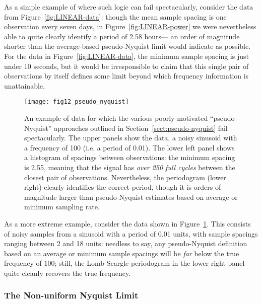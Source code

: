 \documentclass[preprint]{aastex}
\newcommand{\fig}[1]{Figure~\ref{fig:#1}}
\newcommand{\figlabel}[1]{\label{fig:#1}}
\newcommand{\Sect}[1]{Section~\ref{sect:#1}}
\newcommand{\sect}[1]{\Sect{#1}}
\newcommand{\sectlabel}[1]{\label{sect:#1}}
\begin{document}
As a simple example of where such logic can fail spectacularly,
consider the data from \fig{LINEAR-data}: though the mean sample
spacing is one observation every seven days, in \fig{LINEAR-power}
we were nevertheless able to quite clearly identify a period of 2.58 hours---
an order of magnitude shorter than the average-based pseudo-Nyquist limit
would indicate as possible.
For the data in \fig{LINEAR-data}, the minimum sample spacing is just under 10
seconds, but it would be irresponsible to claim that this single pair of
observations by itself defines some limit beyond which frequency information
is unattainable.

\begin{figure}[ht]
  \centering
  \texttt{[image: fig12\_pseudo\_nyquist]}
  \caption{An example of data for which the various poorly-motivated
    ``pseudo-Nyquist'' approaches outlined in \sect{pseudo-nyquist} fail
    spectacularly. The upper panels show the data, a noisy sinusoid with
    a frequency of 100 (i.e. a period of 0.01).
    The lower left panel shows a histogram of spacings between observations:
    the minimum spacing is 2.55, meaning that the signal has
    {\it over 250 full cycles} between the closest pair of observations.
    Nevertheless, the periodogram (lower right) clearly identifies the correct
    period, though it is orders of magnitude larger than pseudo-Nyquist
    estimates based on average or minimum sampling rate.
    \figlabel{pseudo-nyquist}}
\end{figure}

As a more extreme example, consider the data shown in \fig{pseudo-nyquist}.
This consists of noisy samples from a sinusoid with a period of 0.01 units,
with sample spacings ranging between 2 and 18 units: needless to say, any
pseudo-Nyquist definition based on an average or minimum sample spacings
will be {\it far} below the true frequency of 100; still, the
Lomb-Scargle periodogram in the lower right panel quite cleanly
recovers the true frequency.

\subsubsection{The Non-uniform Nyquist Limit}
\sectlabel{non-uniform-nyquist}
\end{document}
